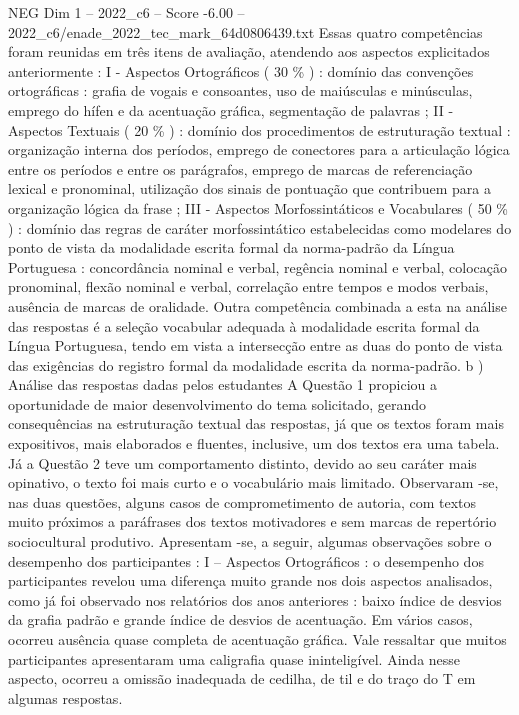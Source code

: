 \begin{textsample}{NEG Dim 1 – 2022\_c6 – Score -6.00 – 2022\_c6/enade\_2022\_tec\_mark\_64d0806439.txt}
Essas quatro competências foram reunidas em três itens de avaliação, atendendo aos aspectos explicitados anteriormente : I - Aspectos Ortográficos ( 30 \% ) : domínio das convenções ortográficas : grafia de vogais e consoantes, uso de maiúsculas e minúsculas, emprego do hífen e da acentuação gráfica, segmentação de palavras ; II - Aspectos Textuais ( 20 \% ) : domínio dos procedimentos de estruturação textual : organização interna dos períodos, emprego de conectores para a articulação lógica entre os períodos e entre os parágrafos, emprego de marcas de referenciação lexical e pronominal, utilização dos sinais de pontuação que contribuem para a organização lógica da frase ; III - Aspectos Morfossintáticos e Vocabulares ( 50 \% ) : domínio das regras de caráter morfossintático estabelecidas como modelares do ponto de vista da modalidade escrita formal da norma-padrão da Língua Portuguesa : concordância nominal e verbal, regência nominal e verbal, colocação pronominal, flexão nominal e verbal, correlação entre tempos e modos verbais, ausência de marcas de oralidade.
Outra competência combinada a esta na análise das respostas é a seleção vocabular adequada à modalidade escrita formal da Língua Portuguesa, tendo em vista a intersecção entre as duas do ponto de vista das exigências do registro formal da modalidade escrita da norma-padrão. b ) Análise das respostas dadas pelos estudantes A Questão 1 propiciou a oportunidade de maior desenvolvimento do tema solicitado, gerando consequências na estruturação textual das respostas, já que os textos foram mais expositivos, mais elaborados e fluentes, inclusive, um dos textos era uma tabela.
Já a Questão 2 teve um comportamento distinto, devido ao seu caráter mais opinativo, o texto foi mais curto e o vocabulário mais limitado.
Observaram -se, nas duas questões, alguns casos de comprometimento de autoria, com textos muito próximos a paráfrases dos textos motivadores e sem marcas de repertório sociocultural produtivo.
Apresentam -se, a seguir, algumas observações sobre o desempenho dos participantes : I – Aspectos Ortográficos : o desempenho dos participantes revelou uma diferença muito grande nos dois aspectos analisados, como já foi observado nos relatórios dos anos anteriores : baixo índice de desvios da grafia padrão e grande índice de desvios de acentuação.
Em vários casos, ocorreu ausência quase completa de acentuação gráfica.
Vale ressaltar que muitos participantes apresentaram uma caligrafia quase ininteligível.
Ainda nesse aspecto, ocorreu a omissão inadequada de cedilha, de til e do traço do T em algumas respostas.

\end{textsample}
